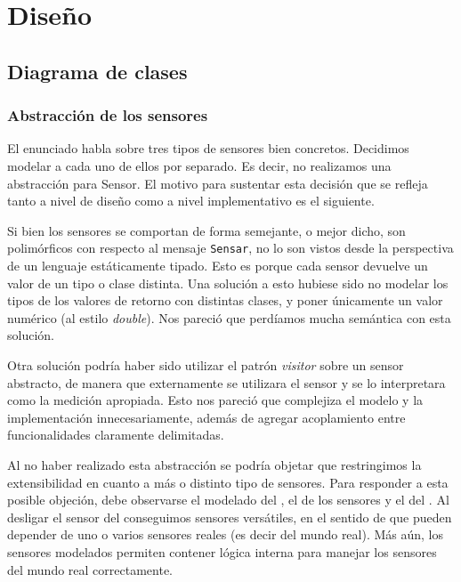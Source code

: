 \section{Dise\~no}

  \subsection{Diagrama de clases}

      \subsubsection{Abstracci\'on de los sensores}
          El enunciado habla sobre tres tipos de sensores bien concretos.
          Decidimos modelar a cada uno de ellos por separado. Es decir, no realizamos
          una abstracci\'on para Sensor. El motivo para sustentar esta decisi\'on
          que se refleja tanto a nivel de dise\~no como a nivel implementativo es
          el siguiente.

          Si bien los sensores se comportan de forma semejante,
          o mejor dicho, son polim\'orficos con respecto al mensaje \texttt{Sensar},
          no lo son vistos desde la perspectiva de un lenguaje est\'aticamente tipado.
          Esto es porque cada sensor devuelve un valor de un tipo o clase distinta.
          Una soluci\'on a esto hubiese sido no modelar los tipos de los valores de
          retorno con distintas clases, y poner \'unicamente un valor num\'erico
          (al estilo \textit{double}). Nos
          pareci\'o que perd\'iamos mucha sem\'antica con esta soluci\'on.

          Otra soluci\'on podr\'ia haber sido utilizar el patr\'on \textit{visitor} sobre
          un sensor abstracto, de manera que externamente se utilizara el sensor y se lo
          interpretara como la medici\'on apropiada. Esto nos pareci\'o que complejiza el
          modelo y la implementaci\'on innecesariamente, adem\'as de agregar acoplamiento
          entre funcionalidades claramente delimitadas.

          Al no haber realizado esta abstracci\'on se podr\'ia objetar que restringimos
          la extensibilidad en cuanto a m\'as o distinto tipo de sensores.
          Para responder a esta posible objeci\'on, debe observarse el modelado del
          \condiciones{}, el de los sensores y el del \arduino{}.
          Al desligar el sensor del \arduino{} conseguimos
          sensores vers\'atiles, en el sentido de que pueden depender de uno o varios sensores
          reales (es decir del mundo real). M\'as a\'un, los sensores modelados
          permiten contener l\'ogica interna para manejar los sensores del mundo real
          correctamente.


